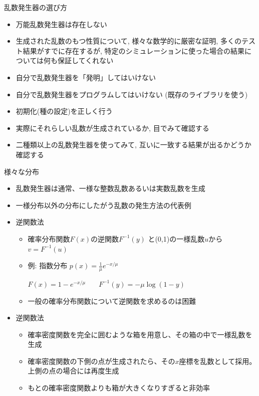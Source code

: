 \begin{frame}[t,fragile]{乱数発生器の選び方}
  \begin{itemize}
  \item 万能乱数発生器は存在しない
  \item 生成された乱数のもつ性質について, 様々な数学的に厳密な証明, 多くのテスト結果がすでに存在するが, 特定のシミュレーションに使った場合の結果については何も保証してくれない
  \item 自分で乱数発生器を「発明」してはいけない
  \item 自分で乱数発生器をプログラムしてはいけない (既存のライブラリを使う)
  \item 初期化(種の設定)を正しく行う
  \item 実際にそれらしい乱数が生成されているか, 目でみて確認する
  \item 二種類以上の乱数発生器を使ってみて, 互いに一致する結果が出るかどうか確認する
  \end{itemize}
\end{frame}

\begin{frame}[t,fragile]{様々な分布}
  \begin{itemize}
  \item 乱数発生器は通常、一様な整数乱数あるいは実数乱数を生成
  \item 一様分布以外の分布にしたがう乱数の発生方法の代表例
  \item 逆関数法
    \begin{itemize}
      \item 確率分布関数$F(x)$の逆関数$F^{-1}(y)$ と(0,1)の一様乱数$u$から $v=F^{-1}(u)$
      \item 例: 指数分布 $p(x) = \frac{1}{\mu} e^{-x/\mu}$

      $F(x) = 1 - e^{-x/\mu}$ \ \ \ $F^{-1}(y) = - \mu \log(1-y)$
      \item 一般の確率分布関数について逆関数を求めるのは困難
    \end{itemize}
  \item 逆関数法
    \begin{itemize}
      \item 確率密度関数を完全に囲むような箱を用意し、その箱の中で一様乱数を生成
      \item 確率密度関数の下側の点が生成されたら、その$x$座標を乱数として採用。上側の点の場合には再度生成
      \item もとの確率密度関数よりも箱が大きくなりすぎると非効率
    \end{itemize}
  \end{itemize}
\end{frame}
